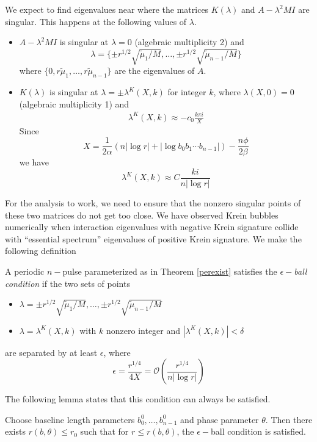 \documentclass[thesis.tex]{subfiles}
\begin{document}
We expect to find eigenvalues near where the matrices $K(\lambda)$ and $A - \lambda^2 MI$ are singular. This happens at the following values of $\lambda$. 
\begin{itemize}
	\item $A - \lambda^2 M I$ is singular at $\lambda = 0$ (algebraic multiplicity 2) and 
	\[
	\lambda = \{ \pm r^{1/2} \sqrt{\tilde{\mu}_1/M}, \dots, \pm r^{1/2} \sqrt{\tilde{\mu}_{n-1}/M}\}
	\]
	where $\{0, r \tilde{\mu}_1, \dots, r \tilde{\mu}_{n-1}\}$ are the eigenvalues of $A$. 

	\item $K(\lambda)$ is singular at $\lambda = \pm \lambda^K(X,k)$ for integer $k$, where $\lambda(X, 0) = 0$ (algebraic multiplicity 1) and
	\begin{align}\label{lambdaXkapprox}
	\lambda^K(X,k) \approx -c_0 \frac{k \pi i }{X} 
	\end{align}
	Since 
	\[
	X = \frac{1}{2\alpha} (n |\log r| + |\log b_0 b_1 \cdots b_{n-1}| ) - \frac{n \phi}{2 \beta}
	\]
	we have
	\[
	\lambda^K(X,k) \approx C \frac{k i}{n |\log r|}
	\]
\end{itemize}  

For the analysis to work, we need to ensure that the nonzero singular points of these two matrices do not get too close. We have observed Krein bubbles numerically when interaction eigenvalues with negative Krein signature collide with ``essential spectrum'' eigenvalues of positive Krein signature. We make the following definition

\begin{definition}\label{epsilonballs}
A periodic $n-$pulse parameterized as in Theorem \ref{perexist} satisfies the \emph{$\epsilon-$ball condition} if the two sets of points 
\begin{itemize}
\item $\lambda = \pm r^{1/2} \sqrt{\tilde{\mu}_1/M}, \dots, \pm r^{1/2} \sqrt{\tilde{\mu}_{n-1}/M}$
\item $\lambda = \lambda^K(X,k)$ with $k$ nonzero integer and $|\lambda^K(X,k)| < \delta$
\end{itemize}
are separated by at least $\epsilon$, where
\[
\epsilon = \frac{r^{1/4}}{4X} = \mathcal{O} \left( \frac{r^{1/4}}{n |\log r| } \right)
\]
\end{definition}

The following lemma states that this condition can always be satisfied.

\begin{lemma}\label{epsilonballlemma}
Choose baseline length parameters $b_0^0, \dots, b_{n-1}^0$ and phase parameter $\theta$. Then there exists $r(b, \theta) \leq r_0$ such that for $r \leq r(b, \theta)$, the $\epsilon-$ball condition is satisfied.
\end{lemma} 
\end{document}
